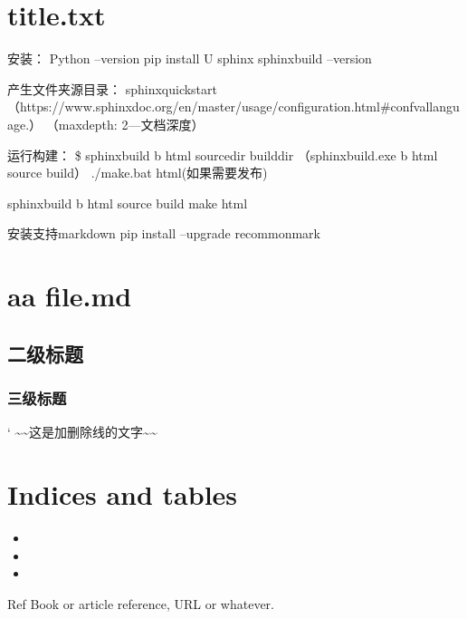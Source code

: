 \documentclass[letterpaper,10pt,english]{sphinxmanual}
\begin{document}
\chapter{title.txt}
\label{\detokenize{12.8:title-txt}}\label{\detokenize{12.8::doc}}
安装：
Python –version
pip install \sphinxhyphen{}U sphinx
sphinx\sphinxhyphen{}build –version

产生文件夹源目录：
sphinx\sphinxhyphen{}quickstart
（https://www.sphinx\sphinxhyphen{}doc.org/en/master/usage/configuration.html\#confval\sphinxhyphen{}language.）
（maxdepth: 2—文档深度）

运行构建：
\$ sphinx\sphinxhyphen{}build \sphinxhyphen{}b html sourcedir builddir
（sphinx\sphinxhyphen{}build.exe \sphinxhyphen{}b html source build）
./make.bat html(如果需要发布)

sphinx\sphinxhyphen{}build \sphinxhyphen{}b html source build
make html

安装支持markdown
pip install –upgrade recommonmark


\chapter{aa file.md}
\label{\detokenize{aa:aa-file-md}}\label{\detokenize{aa::doc}}

\section{二级标题}
\label{\detokenize{aa:id1}}

\subsection{三级标题}
\label{\detokenize{aa:id2}}
`
\textasciitilde{}\textasciitilde{}这是加删除线的文字\textasciitilde{}\textasciitilde{}


\chapter{Indices and tables}
\label{\detokenize{index:indices-and-tables}}\begin{itemize}
\item {} 

\item {} 

\item {} 

\end{itemize}

\begin{sphinxthebibliography}{Ref}
Book or article reference, URL or whatever.
\end{sphinxthebibliography}



\renewcommand{\indexname}{索引}
\printindex
\end{document}

